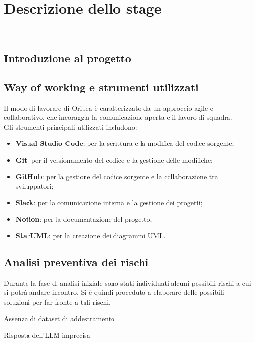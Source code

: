 \chapter{Descrizione dello stage}
\label{cap:descrizione-stage}

\\

\section{Introduzione al progetto}


\section{Way of working e strumenti utilizzati}
\label{sec:way-of-working}

Il modo di lavorare di Oribea è caratterizzato da un approccio agile e collaborativo, che incoraggia la comunicazione aperta e il lavoro di squadra.\\

Gli strumenti principali utilizzati includono:
\begin{itemize}
    \item \textbf{Visual Studio Code}: per la scrittura e la modifica del codice sorgente;
    \item \textbf{Git}: per il versionamento del codice e la gestione delle modifiche;
    \item \textbf{GitHub}: per la gestione del codice sorgente e la collaborazione tra sviluppatori;
    \item \textbf{Slack}: per la comunicazione interna e la gestione dei progetti;
    \item \textbf{Notion}: per la documentazione del progetto;
    \item \textbf{StarUML}: per la creazione dei diagrammi UML.
\end{itemize}

\section{Analisi preventiva dei rischi}

Durante la fase di analisi iniziale sono stati individuati alcuni possibili rischi a cui si potrà andare incontro.
Si è quindi proceduto a elaborare delle possibili soluzioni per far fronte a tali rischi.\\

\begin{risk}{Assenza di dataset di addestramento}
    \label{risk:dataset-absence} 
\end{risk}

\begin{risk}{Risposta dell'LLM imprecisa}
    \label{risk:bad-llm-response} 
\end{risk}
